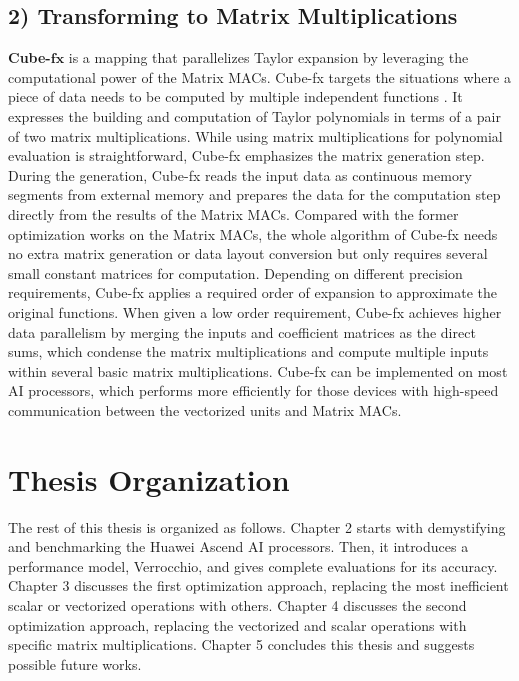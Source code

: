 \subsection{2) Transforming to Matrix Multiplications}

\textbf{Cube-}$\mathbf{fx}$ is a mapping that parallelizes Taylor expansion by leveraging the computational power of the Matrix MACs. Cube-fx targets the situations where a piece of data needs to be computed by multiple independent functions \cite{boyd2004convex, guyon2006introduction, DBLP:conf/icpr/ManessiR18}. It expresses the building and computation of Taylor polynomials in terms of a pair of two matrix multiplications. While using matrix multiplications for polynomial evaluation is straightforward, Cube-fx emphasizes the matrix generation step. During the generation, Cube-fx reads the input data as continuous memory segments from external memory and prepares the data for the computation step directly from the results of the Matrix MACs. Compared with the former optimization works on the Matrix MACs, the whole algorithm of Cube-fx needs no extra matrix generation or data layout conversion but only requires several small constant matrices for computation. Depending on different precision requirements, Cube-fx applies a required order of expansion to approximate the original functions. When given a low order requirement, Cube-fx achieves higher data parallelism by merging the inputs and coefficient matrices as the direct sums, which condense the matrix multiplications and compute multiple inputs within several basic matrix multiplications. Cube-fx can be implemented on most AI processors, which performs more efficiently for those devices with high-speed communication between the vectorized units and Matrix MACs.

\section{Thesis Organization}
\label{sec_1_4_organization}

The rest of this thesis is organized as follows. Chapter 2 starts with demystifying and benchmarking the Huawei Ascend AI processors. Then, it introduces a performance model, Verrocchio, and gives complete evaluations for its accuracy. Chapter 3 discusses the first optimization approach, replacing the most inefficient scalar or vectorized operations with others. Chapter 4 discusses the second optimization approach, replacing the vectorized and scalar operations with specific matrix multiplications. Chapter 5 concludes this thesis and suggests possible future works.